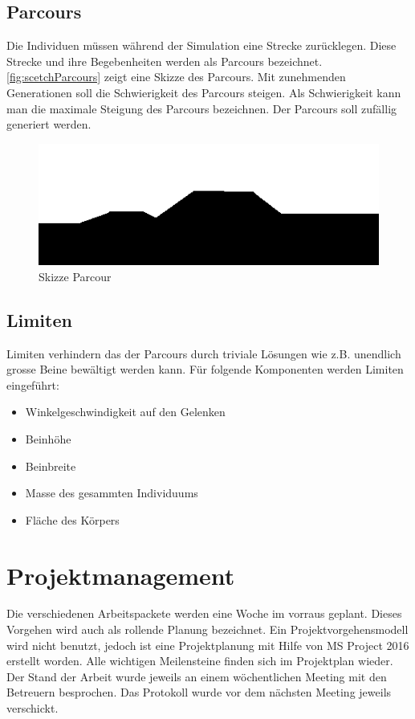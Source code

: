     \subsection{Parcours\label{subsub:parcours}}
      Die Individuen müssen während der Simulation eine Strecke zurücklegen.
      Diese Strecke und ihre Begebenheiten werden als Parcours bezeichnet.
      \vref{fig:scetchParcours} zeigt eine Skizze des Parcours.
      Mit zunehmenden Generationen soll die Schwierigkeit des Parcours steigen.
      Als Schwierigkeit kann man die maximale Steigung des Parcours bezeichnen.
      Der Parcours soll zufällig generiert werden.

      \begin{figure}[H]
        \includegraphics[scale=1]{graphics/scetch_parcours}
        \caption{Skizze Parcour\label{fig:scetchParcours}}
      \end{figure}


    \subsection{Limiten}
      Limiten verhindern das der Parcours durch triviale Lösungen wie z.B. unendlich grosse Beine bewältigt werden kann.
      Für folgende Komponenten werden Limiten eingeführt:
      \begin{itemize}
        \item Winkelgeschwindigkeit auf den Gelenken
        \item Beinhöhe
        \item Beinbreite
        \item Masse des gesammten Individuums
        \item Fläche des Körpers
      \end{itemize}

    \section{Projektmanagement}
      Die verschiedenen Arbeitspackete werden eine Woche im vorraus geplant.
      Dieses Vorgehen wird auch als rollende Planung bezeichnet.
      Ein Projektvorgehensmodell wird nicht benutzt, jedoch ist eine Projektplanung mit Hilfe von MS Project 2016
      erstellt worden. Alle wichtigen Meilensteine finden sich im Projektplan wieder.
      Der Stand der Arbeit wurde jeweils an einem wöchentlichen Meeting mit den Betreuern besprochen.
      Das Protokoll wurde vor dem nächsten Meeting jeweils verschickt.
